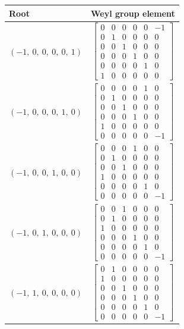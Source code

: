 \documentclass[11pt]{article}
\newcommand{\noi}{\noindent}
\theoremstyle{definition}
\begin{document}
\noi \noindent \begin{longtable}{|l|c|}
    \hline
    \textbf{Root} & \textbf{Weyl group element} \\
    \hline
    \endhead
    $\left( -1, \  0, \  0, \  0, \  0, \  1\right)$ & ${\left[\begin{matrix}0 & 0 & 0 & 0 & 0 & -1\\0 & 1 & 0 & 0 & 0 & 0\\0 & 0 & 1 & 0 & 0 & 0\\0 & 0 & 0 & 1 & 0 & 0\\0 & 0 & 0 & 0 & 1 & 0\\1 & 0 & 0 & 0 & 0 & 0\end{matrix}\right]}$ \\
    \hline
    $\left( -1, \  0, \  0, \  0, \  1, \  0\right)$ & ${\left[\begin{matrix}0 & 0 & 0 & 0 & 1 & 0\\0 & 1 & 0 & 0 & 0 & 0\\0 & 0 & 1 & 0 & 0 & 0\\0 & 0 & 0 & 1 & 0 & 0\\1 & 0 & 0 & 0 & 0 & 0\\0 & 0 & 0 & 0 & 0 & -1\end{matrix}\right]}$ \\
    \hline
    $\left( -1, \  0, \  0, \  1, \  0, \  0\right)$ & ${\left[\begin{matrix}0 & 0 & 0 & 1 & 0 & 0\\0 & 1 & 0 & 0 & 0 & 0\\0 & 0 & 1 & 0 & 0 & 0\\1 & 0 & 0 & 0 & 0 & 0\\0 & 0 & 0 & 0 & 1 & 0\\0 & 0 & 0 & 0 & 0 & -1\end{matrix}\right]}$ \\
    \hline
    $\left( -1, \  0, \  1, \  0, \  0, \  0\right)$ & ${\left[\begin{matrix}0 & 0 & 1 & 0 & 0 & 0\\0 & 1 & 0 & 0 & 0 & 0\\1 & 0 & 0 & 0 & 0 & 0\\0 & 0 & 0 & 1 & 0 & 0\\0 & 0 & 0 & 0 & 1 & 0\\0 & 0 & 0 & 0 & 0 & -1\end{matrix}\right]}$ \\
    \hline
    $\left( -1, \  1, \  0, \  0, \  0, \  0\right)$ & ${\left[\begin{matrix}0 & 1 & 0 & 0 & 0 & 0\\1 & 0 & 0 & 0 & 0 & 0\\0 & 0 & 1 & 0 & 0 & 0\\0 & 0 & 0 & 1 & 0 & 0\\0 & 0 & 0 & 0 & 1 & 0\\0 & 0 & 0 & 0 & 0 & -1\end{matrix}\right]}$ \\

\end{longtable}
\end{document}
